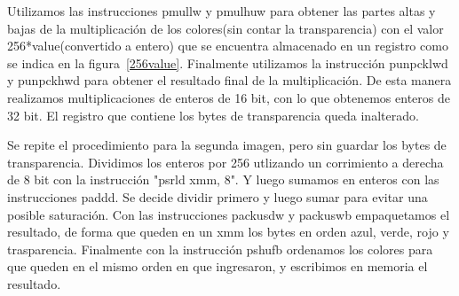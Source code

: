 \documentclass[a4paper]{article}
\begin{document}
Utilizamos las instrucciones pmullw y pmulhuw para obtener las partes altas y bajas de la multiplicación de los colores(sin contar la transparencia) con el valor 256*value(convertido a entero) que se encuentra almacenado en un registro como se indica en la figura~\ref{256value}. Finalmente utilizamos la instrucción punpcklwd y punpckhwd para obtener el resultado final de la multiplicación. De esta manera realizamos multiplicaciones de enteros de 16 bit, con lo que obtenemos enteros de 32 bit. El registro que contiene los bytes de transparencia queda inalterado.

Se repite el procedimiento para la segunda imagen, pero sin guardar los bytes de transparencia. Dividimos los enteros por 256 utlizando un corrimiento a derecha de 8 bit con la instrucción "psrld xmm, 8". Y luego sumamos en enteros con las instrucciones paddd. Se decide dividir primero y luego sumar para evitar una posible saturación. Con las instrucciones packusdw y packuswb empaquetamos el resultado, de forma que queden en un xmm los bytes en orden azul, verde, rojo y trasparencia. Finalmente con la instrucción pshufb ordenamos los colores para que queden en el mismo orden en que ingresaron, y escribimos en memoria el resultado.
\end{document}
